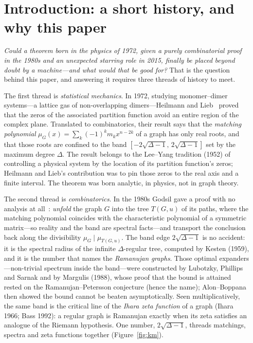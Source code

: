 \documentclass[11pt]{article}
\begin{document}
\section{Introduction: a short history, and why this paper}
\label{sec:history}

\emph{Could a theorem born in the physics of 1972, given a purely combinatorial
proof in the 1980s and an unexpected starring role in 2015, finally be placed
beyond doubt by a machine---and what would that be good for?} That is the question
behind this paper, and answering it requires three threads of history to meet.

The first thread is \emph{statistical mechanics}. In 1972, studying monomer--dimer
systems---a lattice gas of non-overlapping dimers---Heilmann and
Lieb~\cite{HeilmannLieb1972} proved that the zeros of the associated partition
function avoid an entire region of the complex plane. Translated to combinatorics,
their result says that the \emph{matching polynomial}
$\mu_G(x)=\sum_k(-1)^k m_k x^{n-2k}$ of a graph has only real roots, and that those
roots are confined to the band $[-2\sqrt{\Delta-1},\,2\sqrt{\Delta-1}]$ set by the
maximum degree $\Delta$. The result belongs to the Lee--Yang tradition (1952) of
controlling a physical system by the location of its partition function's zeros;
Heilmann and Lieb's contribution was to pin those zeros to the real axis and a
finite interval. The theorem was born analytic, in physics, not in graph theory.

The second thread is \emph{combinatorics}. In the 1980s Godsil gave a proof with
no analysis at all~\cite{Godsil1981Matchings,Godsil1993}: \emph{unfold} the graph
$G$ into the tree $T(G,u)$ of its paths, where the matching polynomial coincides
with the characteristic polynomial of a symmetric matrix---so reality and the band
are spectral facts---and transport the conclusion back along the divisibility
$\mu_G\mid\mu_{T(G,u)}$. The band edge $2\sqrt{\Delta-1}$ is no accident: it is the
spectral radius of the infinite $\Delta$-regular tree, computed by Kesten (1959),
and it is the number that names the \emph{Ramanujan graphs}. Those optimal
expanders---non-trivial spectrum inside the band---were constructed by Lubotzky,
Phillips and Sarnak and by Margulis (1988), whose proof that the bound is attained
rested on the Ramanujan--Petersson conjecture (hence the name); Alon--Boppana then
showed the bound cannot be beaten asymptotically. Seen multiplicatively, the same
band is the critical line of the \emph{Ihara zeta function} of a graph (Ihara 1966;
Bass 1992): a regular graph is Ramanujan exactly when its zeta satisfies an
analogue of the Riemann hypothesis. One number, $2\sqrt{\Delta-1}$, threads
matchings, spectra and zeta functions together (Figure~\ref{fig:km}).
\end{document}

